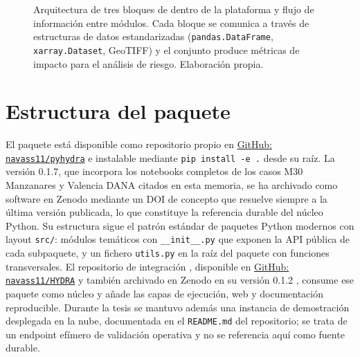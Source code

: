 \begin{figure}[p]
{
}
\caption{Arquitectura de tres bloques de \pyhydra dentro de la plataforma \hydra y flujo de información entre módulos. Cada bloque se comunica a través de estructuras de datos estandarizadas (\texttt{pandas.DataFrame}, \texttt{xarray.Dataset}, GeoTIFF) y el conjunto produce métricas de impacto para el análisis de riesgo. Elaboración propia.}
\label{fig:arquitectura_hydra}
\end{figure}

\section{Estructura del paquete}

El paquete \pyhydra está disponible como repositorio propio en \href{https://github.com/navass11/pyhydra}{GitHub: \texttt{navass11/pyhydra}} e instalable mediante \texttt{pip install -e .} desde su raíz. La versión 0.1.7, que incorpora los notebooks completos de los casos M30 Manzanares y Valencia DANA citados en esta memoria, se ha archivado como software en Zenodo \parencite{navas2026pyhydra} mediante un DOI de concepto que resuelve siempre a la última versión publicada, lo que constituye la referencia durable del núcleo Python. Su estructura sigue el patrón estándar de paquetes Python modernos con layout \texttt{src/}: módulos temáticos con \texttt{\_\_init\_\_.py} que exponen la API pública de cada subpaquete, y un fichero \texttt{utils.py} en la raíz del paquete con funciones transversales. El repositorio de integración \hydra, disponible en \href{https://github.com/navass11/HYDRA}{GitHub: \texttt{navass11/HYDRA}} y también archivado en Zenodo en su versión 0.1.2 \parencite{navas2026hydrarepo}, consume ese paquete como núcleo y añade las capas de ejecución, web y documentación reproducible. Durante la tesis se mantuvo además una instancia de demostración desplegada en la nube, documentada en el \texttt{README.md} del repositorio; se trata de un endpoint efímero de validación operativa y no se referencia aquí como fuente durable.

